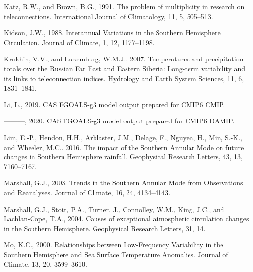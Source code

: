 \documentclass[12pt,oneside]{reedthesis}
\newlength{\cslhangindent}
\newenvironment{CSLReferences}[2] %
 {%
  \setlength{\parindent}{0pt}
  \ifodd #1 \everypar{\setlength{\hangindent}{\cslhangindent}}\ignorespaces\fi
  \ifnum #2 > 0
  \setlength{\parskip}{#2\baselineskip}
  \fi
 }%
 {}
\begin{document}
\begin{CSLReferences}{1}{0}
\leavevmode{}%
Katz, R.W., and Brown, B.G., 1991. \href{https://doi.org/10.1002/joc.3370110504}{The problem of multiplicity in research on teleconnections}. International Journal of Climatology, 11, 5, 505--513.

\leavevmode{}%
Kidson, J.W., 1988. \href{https://doi.org/10.1175/1520-0442(1988)001\%3C1177:IVITSH\%3E2.0.CO;2}{Interannual {Variations} in the {Southern Hemisphere Circulation}}. Journal of Climate, 1, 12, 1177--1198.

\leavevmode{}%
Krokhin, V.V., and Luxemburg, W.M.J., 2007. \href{https://doi.org/10.5194/hess-11-1831-2007}{Temperatures and precipitation totals over the {Russian Far East} and {Eastern Siberia}: Long-term variability and its links to teleconnection indices}. Hydrology and Earth System Sciences, 11, 6, 1831--1841.

\leavevmode{}%
Li, L., 2019. \href{https://doi.org/10.22033/ESGF/CMIP6.1783}{CAS FGOALS-g3 model output prepared for CMIP6 CMIP}.

\leavevmode{}%
---------, 2020. \href{https://doi.org/10.22033/ESGF/CMIP6.2048}{CAS FGOALS-g3 model output prepared for CMIP6 DAMIP}.

\leavevmode{}%
Lim, E.-P., Hendon, H.H., Arblaster, J.M., Delage, F., Nguyen, H., Min, S.-K., and Wheeler, M.C., 2016. \href{https://doi.org/10.1002/2016GL069453}{The impact of the {Southern Annular Mode} on future changes in {Southern Hemisphere} rainfall}. Geophysical Research Letters, 43, 13, 7160--7167.

\leavevmode{}%
Marshall, G.J., 2003. \href{https://doi.org/10.1175/1520-0442(2003)016\%3C4134:TITSAM\%3E2.0.CO;2}{Trends in the {Southern Annular Mode} from {Observations} and {Reanalyses}}. Journal of Climate, 16, 24, 4134--4143.

\leavevmode{}%
Marshall, G.J., Stott, P.A., Turner, J., Connolley, W.M., King, J.C., and Lachlan-Cope, T.A., 2004. \href{https://doi.org/10.1029/2004GL019952}{Causes of exceptional atmospheric circulation changes in the {Southern Hemisphere}}. Geophysical Research Letters, 31, 14.

\leavevmode{}%
Mo, K.C., 2000. \href{https://doi.org/10.1175/1520-0442(2000)013\%3C3599:RBLFVI\%3E2.0.CO;2}{Relationships between {Low-Frequency Variability} in the {Southern Hemisphere} and {Sea Surface Temperature Anomalies}}. Journal of Climate, 13, 20, 3599--3610.


\end{CSLReferences}
\end{document}
